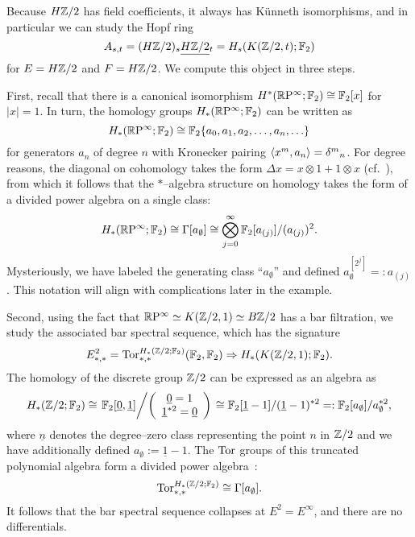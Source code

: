 \begin{example}
Because $H\mathbb Z/2$ has field coefficients, it always has K\"unneth isomorphisms, and in particular we can study the Hopf ring \[A_{s, t} = (H\mathbb Z/2)_s \smash{\underline{H\mathbb Z/2}}_{t} = H_s(K(\mathbb Z/2, t); \mathbb F_2)\] for $E = H\mathbb Z/2$ and $F = H\mathbb Z/2$.  We compute this object in three steps.

First, recall that there is a canonical isomorphism $H^*(\mathbb R\mathrm P^\infty; \mathbb F_2) \cong \mathbb F_2[x]$ for $|x| = 1$.  In turn, the homology groups $H_*(\mathbb R\mathrm P^\infty; \mathbb F_2)$ can be written as \[H_*(\mathbb R\mathrm P^\infty; \mathbb F_2) \cong \mathbb F_2\{a_0, a_1, a_2, \ldots, a_n, \ldots\}\] for generators $a_n$ of degree $n$ with Kronecker pairing $\langle x^m, a_n\rangle = \delta{}^m{}_n$.  For degree reasons, the diagonal on cohomology takes the form $\Delta x = x \otimes 1 + 1 \otimes x$ (cf.\ ), from which it follows that the $\ast$--algebra structure on homology takes the form of a divided power algebra on a single class: \[H_*(\mathbb R\mathrm P^\infty; \mathbb F_2) \cong \Gamma[a_\emptyset] \cong \bigotimes_{j=0}^\infty \mathbb F_2[a_{(j)}] / (a_{(j)})^2.\]  Mysteriously, we have labeled the generating class ``$a_\emptyset$'' and defined $a_\emptyset^{[2^j]} =: a_{(j)}$. This notation will align with complications later in the example.

Second, using the fact that $\mathbb R\mathrm P^\infty \simeq K(\mathbb Z/2, 1) \simeq B\mathbb Z/2$ has a bar filtration, we study the associated bar spectral sequence, which has the signature \[E^2_{*, *} = \operatorname{Tor}^{H_*(\mathbb Z/2; \mathbb F_2)}_{*, *}(\mathbb F_2, \mathbb F_2) \Rightarrow H_*(K(\mathbb Z/2, 1); \mathbb F_2).\]  The homology of the discrete group $\mathbb Z/2$ can be expressed as an algebra as
\[
H_*(\mathbb Z/2; \mathbb F_2) \cong \left. \mathbb F_2[\underline 0, \underline 1] \middle/ \left(\begin{array}{c} \underline 0 = 1 \\ \underline 1^{\ast 2} = \underline 0\end{array}\right) \right. \cong \mathbb F_2[\underline 1 - 1] / (\underline 1 - 1)^{\ast 2} =: \mathbb F_2[a_\emptyset] / a_\emptyset^{\ast 2},
\]
where $\underline n$ denotes the degree--zero class representing the point $n$ in $\mathbb Z/2$ and we have additionally defined $a_\emptyset := \underline 1 - 1$.  The $\operatorname{Tor}$ groups of this truncated polynomial algebra form a divided power algebra~\cite{TateResolutions}: \[\operatorname{Tor}^{H_*(\mathbb Z/2; \mathbb F_2)}_{*, *} \cong \Gamma[a_\emptyset].\]  It follows that the bar spectral sequence collapses at $E^2 = E^\infty$, and there are no differentials.


\end{example}
